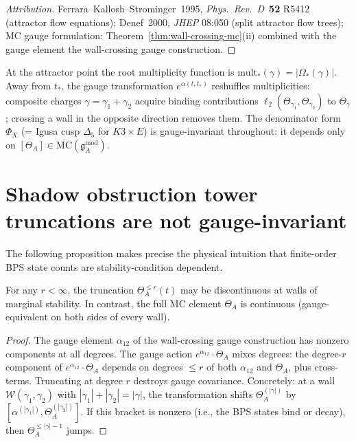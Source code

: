 \begin{proof}[Attribution]
Ferrara--Kallosh--Strominger~1995, \emph{Phys.\ Rev.\ D}~\textbf{52} R5412 (attractor flow equations); Denef~2000, \emph{JHEP} 08:050 (split attractor flow trees); MC gauge formulation: Theorem~\ref{thm:wall-crossing-mc}(ii) combined with the gauge element the wall-crossing gauge construction.
\end{proof}

\begin{remark}
At the attractor point the root multiplicity function is $\mathrm{mult}_*(\gamma) = |\Omega_*(\gamma)|$. Away from $t_*$, the gauge transformation $e^{\alpha(t,t_*)}$ reshuffles multiplicities: composite charges $\gamma = \gamma_1 + \gamma_2$ acquire binding contributions $\ell_2(\Theta_{\gamma_1}, \Theta_{\gamma_2})$ to $\Theta_\gamma$; crossing a wall in the opposite direction removes them. The denominator form $\Phi_X$ (= Igusa cusp $\Delta_5$ for $K3 \times E$) is gauge-invariant throughout: it depends only on $[\Theta_A] \in \overline{\mathrm{MC}}(\mathfrak{g}^{\mathrm{mod}}_A)$.
\end{remark}

\section{Shadow obstruction tower truncations are not gauge-invariant}
\label{sec:phys-wc-shadow-jump}

The following proposition makes precise the physical intuition that finite-order BPS state counts are stability-condition dependent.

\begin{proposition}
\label{prop:phys-shadow-jump}
For any $r < \infty$, the truncation $\Theta^{\leq r}_A(t)$ may be discontinuous at walls of marginal stability. In contrast, the full MC element $\Theta_A$ is continuous (gauge-equivalent on both sides of every wall).
\end{proposition}

\begin{proof}
The gauge element $\alpha_{12}$ of the wall-crossing gauge construction has nonzero components at all degrees. The gauge action $e^{\alpha_{12}} \cdot \Theta_A$ mixes degrees: the degree-$r$ component of $e^{\alpha_{12}} \cdot \Theta_A$ depends on degrees $\leq r$ of both $\alpha_{12}$ and $\Theta_A$, plus cross-terms. Truncating at degree $r$ destroys gauge covariance. Concretely: at a wall $\mathcal{W}(\gamma_1, \gamma_2)$ with $|\gamma_1| + |\gamma_2| = |\gamma|$, the transformation shifts $\Theta^{(|\gamma|)}_A$ by $[\alpha^{(|\gamma_1|)}, \Theta^{(|\gamma_2|)}_A]$. If this bracket is nonzero (i.e., the BPS states bind or decay), then $\Theta^{\leq |\gamma| - 1}_A$ jumps.
\end{proof}

